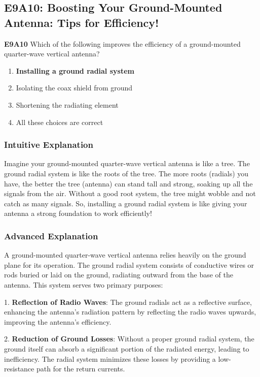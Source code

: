 \subsection{E9A10: Boosting Your Ground-Mounted Antenna: Tips for Efficiency!}

\begin{tcolorbox}[colback=gray!10!white,colframe=black!75!black,title=Question E9A10]
\textbf{E9A10} Which of the following improves the efficiency of a ground-mounted quarter-wave vertical antenna?
\begin{enumerate}[label=\Alph*.]
    \item \textbf{Installing a ground radial system}
    \item Isolating the coax shield from ground
    \item Shortening the radiating element
    \item All these choices are correct
\end{enumerate}
\end{tcolorbox}

\subsubsection{Intuitive Explanation}
Imagine your ground-mounted quarter-wave vertical antenna is like a tree. The ground radial system is like the roots of the tree. The more roots (radials) you have, the better the tree (antenna) can stand tall and strong, soaking up all the signals from the air. Without a good root system, the tree might wobble and not catch as many signals. So, installing a ground radial system is like giving your antenna a strong foundation to work efficiently!

\subsubsection{Advanced Explanation}
A ground-mounted quarter-wave vertical antenna relies heavily on the ground plane for its operation. The ground radial system consists of conductive wires or rods buried or laid on the ground, radiating outward from the base of the antenna. This system serves two primary purposes:

1. \textbf{Reflection of Radio Waves}: The ground radials act as a reflective surface, enhancing the antenna's radiation pattern by reflecting the radio waves upwards, improving the antenna's efficiency.

2. \textbf{Reduction of Ground Losses}: Without a proper ground radial system, the ground itself can absorb a significant portion of the radiated energy, leading to inefficiency. The radial system minimizes these losses by providing a low-resistance path for the return currents.

